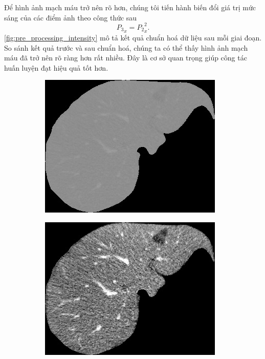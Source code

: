 	Để hình ảnh mạch máu trở nên rõ hơn, chúng tôi tiến hành biến đổi giá trị mức sáng của các điểm ảnh theo công thức sau
	\begin{equation}
		{P_3}_x={P_2}_x^2.
		\label{eqn:normalize_gama}
	\end{equation}
	\autoref{fig:pre_processing_intensity} mô tả kết quả chuẩn hoá dữ liệu sau mỗi giai đoạn. So sánh kết quả trước và sau chuẩn hoá, chúng ta có thể thấy hình ảnh mạch máu đã trở nên rõ ràng hơn rất nhiều. Đây là cơ sở quan trọng giúp công tác huấn luyện đạt hiệu quả tốt hơn.
	\begin{figure}[h!]
		\begin{subfigure}[b]{0.32\textwidth}
			\includegraphics[width=\textwidth]{figures/pre_processing_intensity_origin}
			\caption{}
			\label{fig:pre_processing_intensity_origin}
		\end{subfigure}
		\hfill
		\begin{subfigure}[b]{0.32\textwidth}
			\includegraphics[width=\textwidth]{figures/pre_processing_intensity_clamp}

\end{subfigure}
\end{figure}
